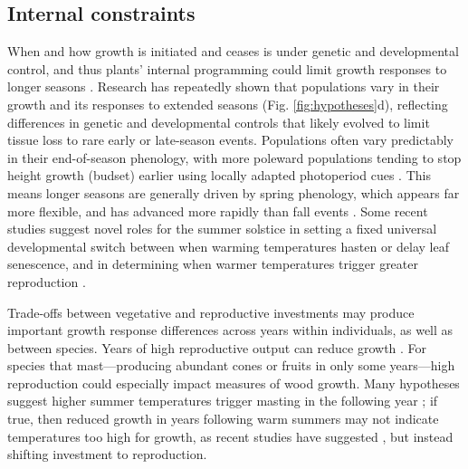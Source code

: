 \documentclass[11pt]{article}
\begin{document}
\subsection*{Internal constraints}
When and how growth is initiated and ceases is under genetic and developmental control, and thus plants' internal programming could limit growth responses to longer seasons \citep{marchand2021timing,mckown2016impacts,soolanayakanahally2013timing}. Research has repeatedly shown that populations vary in their growth and its responses to extended seasons (Fig. \ref{fig:hypotheses}d), reflecting differences in genetic and developmental controls that likely evolved to limit tissue loss to rare early or late-season events. Populations often vary predictably in their end-of-season phenology, with more poleward populations tending to stop height growth (budset) earlier using locally adapted photoperiod cues \citep{soolanayakanahally2013timing,aitken2016}. This means longer seasons are generally driven by spring phenology, which appears far more flexible, and has advanced more rapidly than fall events \citep{aitken2016}. Some recent studies suggest novel roles for the summer solstice \citep{zohner2023effect} in setting a fixed universal developmental switch between when warming temperatures hasten or delay leaf senescence, and in determining when warmer temperatures trigger greater reproduction \citep{Journe2024}. %

Trade-offs between vegetative and reproductive investments may produce important growth response differences across years within individuals, as well as between species. Years of high reproductive output can reduce growth \citep{thomas2011bookchptr,hacket2016tree}. For species that mast---producing abundant cones or fruits in only some years---high reproduction could especially impact measures of wood growth. Many hypotheses suggest higher summer temperatures trigger masting in the following year \citep{hacket2016tree,hacket2016consistent}; if true, then reduced growth in years following warm summers may not indicate temperatures too high for growth, as recent studies have suggested \citep[e.g.][]{gantois2022new,dow2022warm}, but instead shifting investment to reproduction.
\end{document}
